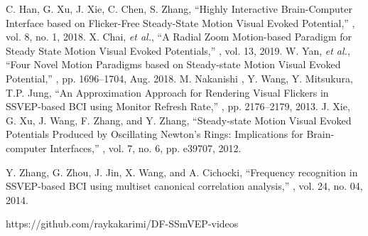 \documentclass[sensors,accept,moreauthors,pdftex,10pt,a4paper]{mdpi}
\theoremstyle{mdpi}
\newcounter{ex}
\newcounter{re}
\theoremstyle{mdpidefinition}
\begin{document}
\begin{thebibliography}{10}
C. Han, G. Xu, J. Xie, C. Chen, S. Zhang,
\newblock ``Highly Interactive Brain-Computer Interface based on Flicker-Free Steady-State Motion Visual Evoked Potential,''
, vol. 8, no. 1, 2018.
%
X. Chai, \textit{et al.},
\newblock ``A Radial Zoom Motion-based Paradigm for Steady State Motion Visual Evoked Potentials,''
, vol. 13, 2019.
%
W. Yan, \textit{et al.},
\newblock ``Four Novel Motion Paradigms based on Steady-state Motion Visual Evoked Potential,''
, pp. 1696--1704, Aug. 2018.
%
M. Nakanishi , Y. Wang, Y. Mitsukura, T.P. Jung,
\newblock ``An Approximation Approach for Rendering Visual Flickers in SSVEP-based BCI using Monitor Refresh Rate,''  , pp. 2176--2179, 2013.
%
J. Xie, G. Xu, J. Wang, F. Zhang, and Y. Zhang,
\newblock ``Steady-state Motion Visual Evoked Potentials Produced by Oscillating Newton's Rings: Implications for
Brain-computer Interfaces,''
,   vol. 7, no. 6, pp. e39707, 2012.



Y. Zhang, G. Zhou, J. Jin, X. Wang, and A. Cichocki,
\newblock ``Frequency recognition in SSVEP-based BCI using multiset canonical correlation analysis,''
,   vol. 24, no. 04, 2014.

https://github.com/raykakarimi/DF-SSmVEP-videos \\

\end{thebibliography}

\end{document}

